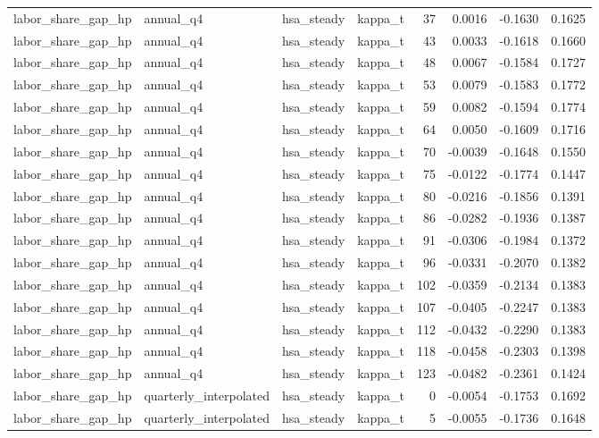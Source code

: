 \begin{tabular}{llllrrrr}
labor\_share\_gap\_hp & annual\_q4 & hsa\_steady & kappa\_t & 37 & 0.0016 & -0.1630 & 0.1625 \\
labor\_share\_gap\_hp & annual\_q4 & hsa\_steady & kappa\_t & 43 & 0.0033 & -0.1618 & 0.1660 \\
labor\_share\_gap\_hp & annual\_q4 & hsa\_steady & kappa\_t & 48 & 0.0067 & -0.1584 & 0.1727 \\
labor\_share\_gap\_hp & annual\_q4 & hsa\_steady & kappa\_t & 53 & 0.0079 & -0.1583 & 0.1772 \\
labor\_share\_gap\_hp & annual\_q4 & hsa\_steady & kappa\_t & 59 & 0.0082 & -0.1594 & 0.1774 \\
labor\_share\_gap\_hp & annual\_q4 & hsa\_steady & kappa\_t & 64 & 0.0050 & -0.1609 & 0.1716 \\
labor\_share\_gap\_hp & annual\_q4 & hsa\_steady & kappa\_t & 70 & -0.0039 & -0.1648 & 0.1550 \\
labor\_share\_gap\_hp & annual\_q4 & hsa\_steady & kappa\_t & 75 & -0.0122 & -0.1774 & 0.1447 \\
labor\_share\_gap\_hp & annual\_q4 & hsa\_steady & kappa\_t & 80 & -0.0216 & -0.1856 & 0.1391 \\
labor\_share\_gap\_hp & annual\_q4 & hsa\_steady & kappa\_t & 86 & -0.0282 & -0.1936 & 0.1387 \\
labor\_share\_gap\_hp & annual\_q4 & hsa\_steady & kappa\_t & 91 & -0.0306 & -0.1984 & 0.1372 \\
labor\_share\_gap\_hp & annual\_q4 & hsa\_steady & kappa\_t & 96 & -0.0331 & -0.2070 & 0.1382 \\
labor\_share\_gap\_hp & annual\_q4 & hsa\_steady & kappa\_t & 102 & -0.0359 & -0.2134 & 0.1383 \\
labor\_share\_gap\_hp & annual\_q4 & hsa\_steady & kappa\_t & 107 & -0.0405 & -0.2247 & 0.1383 \\
labor\_share\_gap\_hp & annual\_q4 & hsa\_steady & kappa\_t & 112 & -0.0432 & -0.2290 & 0.1383 \\
labor\_share\_gap\_hp & annual\_q4 & hsa\_steady & kappa\_t & 118 & -0.0458 & -0.2303 & 0.1398 \\
labor\_share\_gap\_hp & annual\_q4 & hsa\_steady & kappa\_t & 123 & -0.0482 & -0.2361 & 0.1424 \\
labor\_share\_gap\_hp & quarterly\_interpolated & hsa\_steady & kappa\_t & 0 & -0.0054 & -0.1753 & 0.1692 \\
labor\_share\_gap\_hp & quarterly\_interpolated & hsa\_steady & kappa\_t & 5 & -0.0055 & -0.1736 & 0.1648 \\

\end{tabular}
